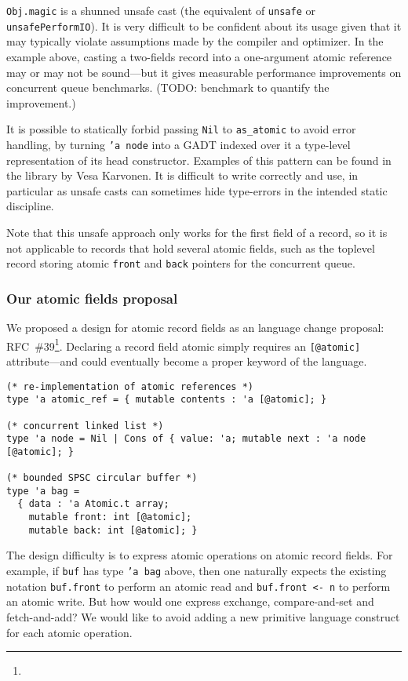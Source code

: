 \texttt{Obj.magic} is a shunned unsafe cast (the \OCaml equivalent of \texttt{unsafe} or \texttt{unsafePerformIO}).
It is very difficult to be confident about its usage given that it may typically violate assumptions made by the \OCaml compiler and optimizer.
In the example above, casting a two-fields record into a one-argument atomic reference may or may not be sound---but it gives measurable performance improvements on concurrent queue benchmarks. (TODO: benchmark to quantify the improvement.)

It is possible to statically forbid passing \texttt{Nil} to \texttt{as_atomic} to avoid error handling, by turning \texttt{'a node} into a GADT indexed over it a type-level representation of its head constructor.
Examples of this pattern can be found in the \Kcas library by Vesa Karvonen.
It is difficult to write correctly and use, in particular as unsafe casts can sometimes hide type-errors in the intended static discipline.

Note that this unsafe approach only works for the first field of a record, so it is not applicable to records that hold several atomic fields, such as the toplevel record storing atomic \texttt{front} and \texttt{back} pointers for the concurrent queue.

\subsubsection{Our atomic fields proposal}

We proposed a design for atomic record fields as an \OCaml language change proposal: RFC~\#39\footnote{}.
Declaring a record field atomic simply requires an \texttt{[@atomic]} attribute---and could eventually become a proper keyword of the language.

\begin{verbatim}
(* re-implementation of atomic references *)
type 'a atomic_ref = { mutable contents : 'a [@atomic]; }

(* concurrent linked list *)
type 'a node = Nil | Cons of { value: 'a; mutable next : 'a node [@atomic]; }

(* bounded SPSC circular buffer *)
type 'a bag =
  { data : 'a Atomic.t array;
    mutable front: int [@atomic];
    mutable back: int [@atomic]; }
\end{verbatim}

The design difficulty is to express atomic operations on atomic record fields.
For example, if \texttt{buf} has type \texttt{'a bag} above, then one naturally expects the existing notation \texttt{buf.front} to perform an atomic read and \texttt{buf.front <- n} to perform an atomic write.
But how would one express exchange, compare-and-set and fetch-and-add?
We would like to avoid adding a new primitive language construct for each atomic operation.

